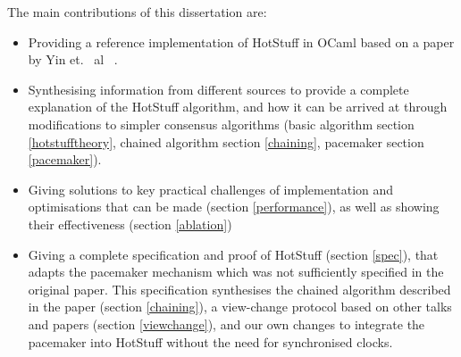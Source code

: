 The main contributions of this dissertation are:
\begin{itemize}
	\item Providing a reference implementation of HotStuff in OCaml based on a paper by Yin et. ~al~ \cite{yin2019hotstuff}.
	\item Synthesising information from different sources to provide a complete explanation of the HotStuff algorithm, and how it can be arrived at through modifications to simpler consensus algorithms (basic algorithm section \ref{hotstufftheory}, chained algorithm section \ref{chaining}, pacemaker section \ref{pacemaker}).
	\item Giving solutions to key practical challenges of implementation and optimisations that can be made (section \ref{performance}), as well as showing their effectiveness (section \ref{ablation})
	\item Giving a complete specification and proof of HotStuff (section \ref{spec}), that adapts the pacemaker mechanism which was not sufficiently specified in the original paper. This specification synthesises the chained algorithm described in the paper (section \ref{chaining}), a view-change protocol based on other talks and papers (section \ref{viewchange}), and our own changes to integrate the pacemaker into HotStuff without the need for synchronised clocks.
\end{itemize}

